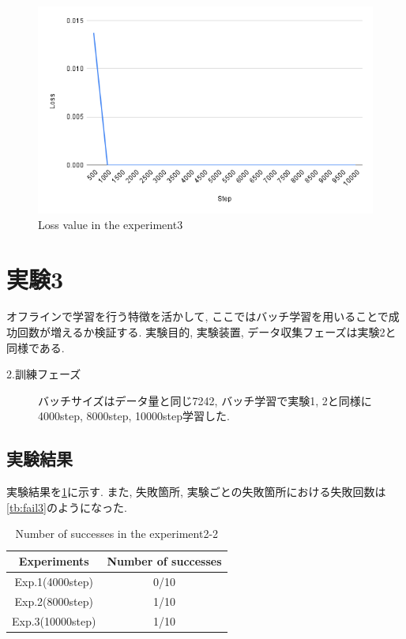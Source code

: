 \begin{figure}[h]
  \centering
  \includegraphics[keepaspectratio, scale=0.31]{images/exp2-10000.png}
  \caption{Loss value in the experiment3}
  \label{Fig:exp2-10000}
  \end{figure}
  
\newpage
\section{実験3}
オフラインで学習を行う特徴を活かして, ここではバッチ学習を用いることで成功回数が増えるか検証する. 実験目的, 実験装置, データ収集フェーズは実験2と同様である. 

\begin{description}
  \item[2.訓練フェーズ] バッチサイズはデータ量と同じ7242, バッチ学習で実験1, 2と同様に4000step, 8000step, 10000step学習した. 
\end{description}

\subsection{実験結果}
実験結果を\ref{tb:exp3}に示す. また, 失敗箇所, 実験ごとの失敗箇所における失敗回数は\ref{tb:fail3}のようになった.

\begin{table}[h]
  \centering
  \begin{tabular}{|c|c|} \hline
    Experiments & Number of successes \\ \hline
    Exp.1(4000step) & 0/10 \\ \hline
    Exp.2(8000step) & 1/10 \\ \hline
    Exp.3(10000step) & 1/10 \\ \hline
  \end{tabular}
  \caption{Number of successes in the experiment2-2}
  \label{tb:exp3}
\end{table}

